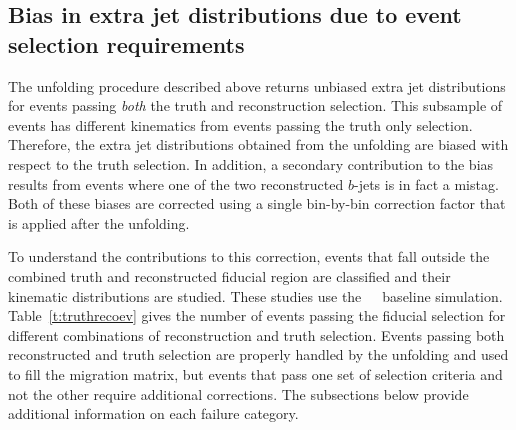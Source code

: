 \subsection{Bias in extra jet distributions due to event selection requirements}
\label{sec:misid}
The unfolding procedure described above returns unbiased extra jet distributions for
events passing \textit{ both} the truth and reconstruction selection.  This subsample of events has
different kinematics from events passing the truth only selection.  Therefore, the extra jet
distributions obtained from the unfolding are biased with respect to the truth selection.
In addition, a secondary contribution to the bias results from events where one of the two reconstructed
$b$-jets is in fact a mistag.
Both of these biases are corrected using a single bin-by-bin correction factor that is applied after the unfolding. 

To understand the contributions to this correction, events that fall outside the combined truth and reconstructed
fiducial region are classified and their kinematic distributions are studied. 
These studies use the~\powpy~\ttbar\ baseline simulation. Table~\ref{t:truthrecoev} gives the number of events passing the fiducial selection for different combinations of reconstruction and truth selection.
Events passing both reconstructed and truth selection are properly handled by the unfolding and used to 
fill the migration matrix, but events that pass one set of selection criteria and not the other 
require additional corrections.  The subsections below provide additional information on each
failure category.


